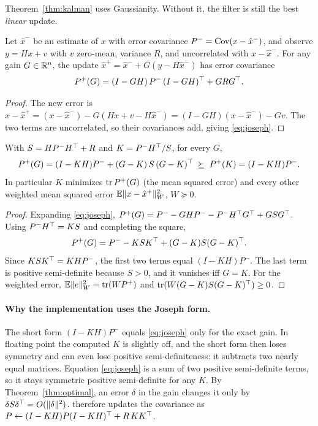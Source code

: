 \documentclass[11pt,a4paper]{article}
\begin{document}
Theorem~\ref{thm:kalman} uses Gaussianity. Without it, the filter is still the
best \emph{linear} update.

\begin{proposition}\label{prop:joseph}
Let $\hat x^-$ be an estimate of $x$ with error covariance
$P^-=\operatorname{Cov}(x-\hat x^-)$, and observe $y=Hx+v$ with $v$ zero-mean, variance $R$,
and uncorrelated with $x-\hat x^-$. For any gain $G\in\mathbb{R}^{n}$, the update
$\hat x^+=\hat x^-+G(y-H\hat x^-)$ has error covariance
\begin{equation}\label{eq:joseph}
  P^+(G) = (I-GH)\,P^-\,(I-GH)^\top + G R G^\top .
\end{equation}
\end{proposition}
\begin{proof}
The new error is $x-\hat x^+ = (x-\hat x^-) - G(Hx+v-H\hat x^-) = (I-GH)(x-\hat x^-) - Gv$.
The two terms are uncorrelated, so their covariances add, giving \eqref{eq:joseph}.
\end{proof}

\begin{theorem}\label{thm:optimal}
With $S=HP^-H^\top+R$ and $K=P^-H^\top/S$, for every $G$,
\[
  P^+(G) = (I-KH)P^- + (G-K)\,S\,(G-K)^\top \;\succeq\; P^+(K) = (I-KH)P^- .
\]
In particular $K$ minimizes $\operatorname{tr} P^+(G)$ (the mean squared error) and every
other weighted mean squared error $\mathbb{E}\lVert x-\hat x^+\rVert_W^2$, $W\succeq0$.
\end{theorem}
\begin{proof}
Expanding \eqref{eq:joseph},
$P^+(G)=P^- - GHP^- - P^-H^\top G^\top + G S G^\top$. Using $P^-H^\top=KS$ and
completing the square,
\[
  P^+(G) = P^- - KSK^\top + (G-K)S(G-K)^\top .
\]
Since $KSK^\top = KHP^-$, the first two terms equal $(I-KH)P^-$. The last term is positive
semi-definite because $S>0$, and it vanishes iff $G=K$. For the weighted error,
$\mathbb{E}\lVert e\rVert_W^2=\operatorname{tr}(WP^+)$ and $\operatorname{tr}(W(G-K)S(G-K)^\top)\ge0$.
\end{proof}

\paragraph{Why the implementation uses the Joseph form.}
The short form $(I-KH)P^-$ equals \eqref{eq:joseph} only for the exact gain.
In floating point the computed $K$ is slightly off, and the short form then
loses symmetry and can even lose positive semi-definiteness: it subtracts two
nearly equal matrices. Equation \eqref{eq:joseph} is a sum of two positive semi-definite
terms, so it stays symmetric positive semi-definite for any $K$. By
Theorem~\ref{thm:optimal}, an error $\delta$ in the gain changes it only by
$\delta S\delta^\top=O(\lVert \delta\rVert^2)$.  therefore updates the
covariance as $P\gets(I-KH)P(I-KH)^\top+R\,KK^\top$.
\end{document}

